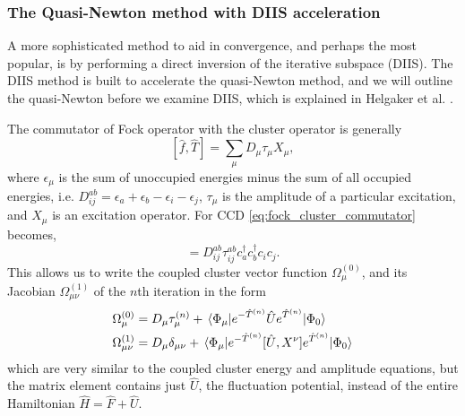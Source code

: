     \subsubsection{The Quasi-Newton method with DIIS acceleration}

    \begin{figure}
    
    \end{figure}

    A more sophisticated method to aid in convergence, and perhaps the most popular,
    is by performing a direct inversion of the iterative subspace (DIIS). The DIIS method 
    is built to accelerate the quasi-Newton method, and we will outline the 
    quasi-Newton before we examine DIIS, which is explained in Helgaker et 
    al. \cite{helgaker2014molecular}.

    The commutator of Fock operator with the cluster operator is generally
    \begin{equation}
        \label{eq:fock_cluster_commutator}
        [\hat{f}, \hat{T}] = \sum_\mu D_\mu \tau_\mu X_\mu,
    \end{equation}
    where $\epsilon_\mu$ is the sum of unoccupied energies minus the sum of all 
    occupied energies, i.e. $D^{ab}_{ij} = \epsilon_a  + \epsilon_b - \epsilon_i - \epsilon_j$,
    $\tau_\mu$ is the amplitude of a particular excitation, and $X_\mu$ is an excitation 
    operator. For CCD \autoref{eq:fock_cluster_commutator} becomes,
    \begin{equation}
        [\hat{f}, \hat{T}_2] = D^{ab}_{ij} \tau^{ab}_{ij} c^\dagger_a c^\dagger_b c_i c_j.
    \end{equation}
    This allows us to write the coupled cluster vector function $\Omega^{(0)}_\mu$,
    and its Jacobian $\Omega^{(1)}_{\mu\nu}$ of the $n$th iteration in the form 
    \begin{align}
        \label{eq:vector_function_diis}
        \Omega^{(0)}_\mu &= D_\mu \tau^{(n)}_\mu 
            + \mel{\Phi_\mu}
            {e^{-\hat{T}^{(n)}} \hat{U} e^{\hat{T}^{(n)}}}
            {\Phi_0} \\
        \label{eq:jacobian_diis}
        \Omega^{(1)}_{\mu\nu} &= D_\mu\delta_{\mu\nu} 
            + \mel{\Phi_\mu}
            {e^{-\hat{T}^{(n)}} [\hat{U}, X^\nu] e^{\hat{T}^{(n)}}}
            {\Phi_0}
    \end{align}
    which are very similar to the coupled cluster energy and amplitude equations, but 
    the matrix element contains just $\hat{U}$, the fluctuation potential, instead of 
    the entire Hamiltonian $\hat{H} = \hat{F} + \hat{U}$.

